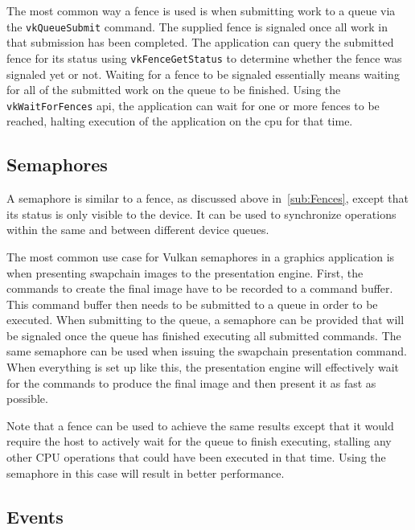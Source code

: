       The most common way a fence is used is when submitting work to a queue via the \lstinline{vkQueueSubmit} command.
      The supplied fence is signaled once all work in that submission has been completed.
      The \gls{application} can query the submitted fence for its status using \lstinline{vkFenceGetStatus} to determine whether the fence was signaled yet or not.
      Waiting for a fence to be signaled essentially means waiting for all of the submitted work on the queue to be finished.
      Using the \lstinline{vkWaitForFences} \gls{api}, the application can wait for one or more fences to be reached, halting execution of the application on the \gls{cpu} for that time.

    \subsection{Semaphores}
    \label{sub:Semaphores}
      A semaphore is similar to a fence, as discussed above in~\ref{sub:Fences}, except that its status is only visible to the device.
      It can be used to synchronize operations within the same and between different device queues.

      The most common use case for Vulkan semaphores in a graphics \gls{application} is when presenting swapchain images to the presentation engine.
      First, the commands to create the final image have to be recorded to a command buffer.
      This command buffer then needs to be submitted to a queue in order to be executed.
      When submitting to the queue, a semaphore can be provided that will be signaled once the queue has finished executing all submitted commands.
      The same semaphore can be used when issuing the swapchain presentation command.
      When everything is set up like this, the presentation engine will effectively wait for the commands to produce the final image and then present it as fast as possible.

      Note that a fence can be used to achieve the same results except that it would require the \gls{host} to actively wait for the queue to finish executing, stalling any other CPU operations that could have been executed in that time.
      Using the semaphore in this case will result in better performance.

    \subsection{Events}
    \label{sub:Events}

